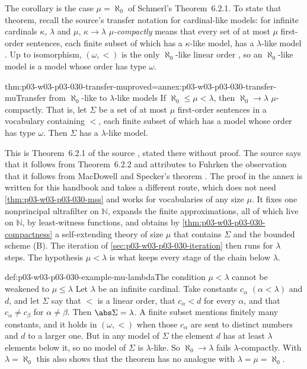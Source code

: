 The corollary is the case \(\mu=\aleph_0\) of Schmerl's Theorem~6.2.1.  To
state that theorem, recall the source's transfer notation for cardinal-like
models: for infinite cardinals \(\kappa\), \(\lambda\) and \(\mu\),
\(\kappa\to\lambda\) \emph{\(\mu\)-compactly} means that every set of at most
\(\mu\) first-order sentences, each finite subset of which has a
\(\kappa\)-like model, has a \(\lambda\)-like model
\cite[Definition~1.3.1, p.~180]{Schmerl1985TransferTheorems}.  Up to
isomorphism, \((\omega,<)\) is the only \(\aleph_0\)-like linear order
\cite[p.~179]{Schmerl1985TransferTheorems}, so an \(\aleph_0\)-like model is
a model whose order has type \(\omega\).

\begin{hbtheorem}{thm:p03-w03-p03-030-transfer-mu}{proved=annex:p03-w03-p03-030-transfer-mu}{Transfer from \(\aleph_0\)-like to \(\lambda\)-like models}
If \(\aleph_0\le\mu<\lambda\), then \(\aleph_0\to\lambda\)
\(\mu\)-compactly.  That is, let \(\Sigma\) be a set of at most \(\mu\)
first-order sentences in a vocabulary containing \(<\), each finite subset of
which has a model whose order has type \(\omega\).  Then \(\Sigma\) has a
\(\lambda\)-like model.
\end{hbtheorem}

This is Theorem~6.2.1 of the source
\cite[p.~206]{Schmerl1985TransferTheorems}, stated there without proof.  The
source says that it follows from Theorem~6.2.2 and attributes to Fuhrken the
observation that it follows from MacDowell and Specker's theorem
\cite[pp.~206--207]{Schmerl1985TransferTheorems}.  The proof in the annex is
written for this handbook and takes a different route, which does not need
\cref{thm:p03-w03-p03-030-mss} and works for vocabularies of any size
\(\mu\).  It fixes one nonprincipal ultrafilter on \(\mathbb N\), expands
the finite approximations, all of which live on \(\mathbb N\), by
least-witness functions, and obtains by
\cref{thm:p03-w03-p03-030-compactness} a self-extending theory of size \(\mu\)
that contains \(\Sigma\) and the bounded scheme (B).  The iteration of
\cref{sec:p03-w03-p03-030-iteration} then runs for \(\lambda\) steps.  The
hypothesis \(\mu<\lambda\) is what keeps every stage of the chain below
\(\lambda\).

\begin{hbexample}{def:p03-w03-p03-030-example-mu-lambda}{The condition \(\mu<\lambda\) cannot be weakened to \(\mu\le\lambda\)}
Let \(\lambda\) be an infinite cardinal.  Take constants \(c_\alpha\)
\((\alpha<\lambda)\) and \(d\), and let \(\Sigma\) say that \(<\) is a linear
order, that \(c_\alpha<d\) for every \(\alpha\), and that
\(c_\alpha\ne c_\beta\) for \(\alpha\ne\beta\).  Then \(\abs\Sigma=\lambda\).
A finite subset mentions finitely many constants, and it holds in
\((\omega,<)\) when those \(c_\alpha\) are sent to distinct numbers and \(d\)
to a larger one.  But in any model of \(\Sigma\) the element \(d\) has at
least \(\lambda\) elements below it, so no model of \(\Sigma\) is
\(\lambda\)-like.  So \(\aleph_0\to\lambda\) fails \(\lambda\)-compactly.  With
\(\lambda=\aleph_0\) this also shows that the theorem has no analogue with
\(\lambda=\mu=\aleph_0\).
\end{hbexample}

